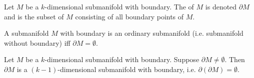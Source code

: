 \documentclass[notoc,notitlepage]{tufte-book}
\begin{document}
\begin{defn}\label{defn:boundary_of_a_submanifold}
  Let $M$ be a $k$-dimensional submanifold with boundary. The 
  of $M$ is denoted $\partial M$ and is the subset of $M$ consisting of all
  boundary points of $M$.
\end{defn}

\begin{note}
  A submanifold $M$ with boundary is an ordinary submanifold (i.e. submanifold
  without boundary) iff $\partial M = \emptyset$.
\end{note}

\begin{propo}\label{propo:dimension_of_the_boundary_of_a_submanifold}
  Let $M$ be a $k$-dimensional submanifold with boundary. Suppose $\partial M
  \neq \emptyset$. Then $\partial M$ is a $(k - 1)$-dimensional submanifold with
  boundary, i.e. $\partial(\partial M) = \emptyset$.
\end{propo}
\end{document}
